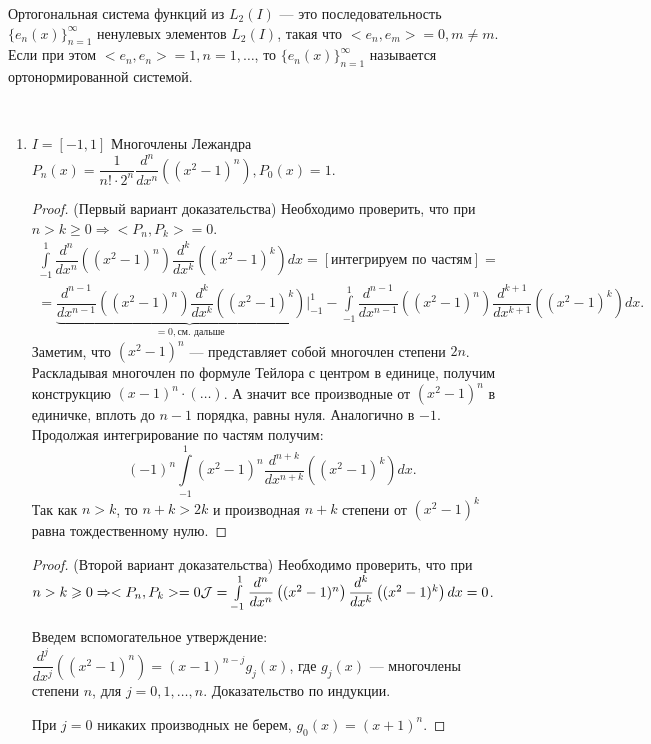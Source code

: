\begin{Def}
	Ортогональная система функций из $L_2(I)$ --- это последовательность $\{e_n(x)\}_{n=1}^\infty$ ненулевых элементов $L_2(I)$, такая что $<e_n,e_m>=0, m\ne m$. Если при этом $<e_n,e_n>=1, n=1,\ldots$, то $\{e_n(x)\}_{n=1}^\infty$ называется ортонормированной системой.
\end{Def}

\begin{example}\ 
	\begin{enumerate}
		\item $I=[-1,1]$ Многочлены Лежандра $P_n(x)=\dfrac{1}{n!\cdot2^n}\dfrac{d^n}{dx^n}\left((x^2-1)^n\right), P_0(x)=1$.
		\begin{proof}(Первый вариант доказательства)
			Необходимо проверить, что при $n>k\geqslant 0 \Rightarrow <P_n, P_k>=0$. 
			\begin{multline*}
				\int\limits_{-1}^1\dfrac{d^n}{dx^n}\left((x^2-1)^n\right)\dfrac{d^k}{dx^k}\left((x^2-1)^k\right)dx=[\text{интегрируем по частям}]=\\=\underbrace{\dfrac{d^{n-1}}{dx^{n-1}}((x^2-1)^n)\dfrac{d^k}{dx^k}((x^2-1)^k)|_{-1}^1}_{=0, \text{см. дальше}}-\int\limits_{-1}^1\dfrac{d^{n-1}}{dx^{n-1}}((x^2-1)^n)\dfrac{d^{k+1}}{dx^{k+1}}((x^2-1)^k)dx.
			\end{multline*}
			Заметим, что $(x^2-1)^n$ --- представляет собой многочлен степени $2n$. Раскладывая многочлен по формуле Тейлора с центром в единице, получим конструкцию $(x-1)^n\cdot(\ldots)$. А значит все производные от $(x^2-1)^n$ в единичке, вплоть до $n-1$ порядка, равны нуля. Аналогично в $-1$. Продолжая интегрирование по частям получим: $$(-1)^n\int\limits_{-1}^1(x^2-1)^n\dfrac{d^{n+k}}{dx^{n+k}}((x^2-1)^k)dx.$$
			Так как $n>k$, то $n+k>2k$ и производная $n+k$ степени от $(x^2-1)^k$ равна тождественному нулю.
		\end{proof}
		\begin{proof}(Второй вариант доказательства)
			Необходимо проверить, что при $n>k\geqslant 0 \Rightarrow <P_n, P_k>=0 \\
			\mathcal{J}=\int\limits_{-1}^1\dfrac{d^n}{dx^n}\left((x^2-1)^n\right)\dfrac{d^k}{dx^k}\left((x^2-1)^k\right)dx=0$.
			
			Введем вспомогательное утверждение: $\dfrac{d^j}{dx^j}((x^2-1)^n)=(x-1)^{n-j}g_j(x)$, где $g_j(x)$ --- многочлены степени $n$, для $j=0,1,\ldots, n$. Доказательство по индукции. 
			
			При $j=0$ никаких производных не берем, $g_0(x)=(x+1)^n$. 
			

\end{proof}
\end{enumerate}
\end{example}
